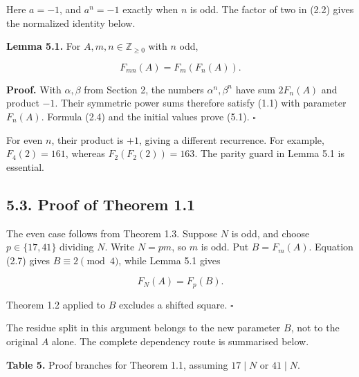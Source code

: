 \documentclass[11pt,a4paper]{article}
\begin{document}
Here \(a=-1\), and \(a^n=-1\) exactly when \(n\) is odd. The factor of
two in (2.2) gives the normalized identity below.

\protect{}\label{lem-composition}
\textbf{Lemma 5.1.} For \(A,m,n\in\mathbb Z_{\ge0}\) with \(n\) odd,

\[
F_{mn}(A)=F_m(F_n(A)).
\tag{5.1}
\]

\textbf{Proof.} With \(\alpha,\beta\) from Section 2, the numbers
\(\alpha^n,\beta^n\) have sum \(2F_n(A)\) and product \(-1\). Their
symmetric power sums therefore satisfy (1.1) with parameter \(F_n(A)\).
Formula (2.4) and the initial values prove (5.1). \(\square\)

For even \(n\), their product is \(+1\), giving a different recurrence.
For example, \(F_4(2)=161\), whereas \(F_2(F_2(2))=163\). The parity
guard in Lemma 5.1 is essential.

\subsection{5.3. Proof of Theorem 1.1}\label{proof-main}

The even case follows from Theorem 1.3. Suppose \(N\) is odd, and choose
\(p\in\{17,41\}\) dividing \(N\). Write \(N=pm\), so \(m\) is odd. Put
\(B=F_m(A)\). Equation (2.7) gives \(B\equiv2\pmod4\), while Lemma 5.1
gives

\[
F_N(A)=F_p(B).
\tag{5.2}
\]

Theorem 1.2 applied to \(B\) excludes a shifted square. \(\square\)

The residue split in this argument belongs to the new parameter \(B\),
not to the original \(A\) alone. The complete dependency route is
summarised below.

\textbf{Table 5.} Proof branches for Theorem 1.1, assuming \(17\mid N\)
or \(41\mid N\).
\end{document}
